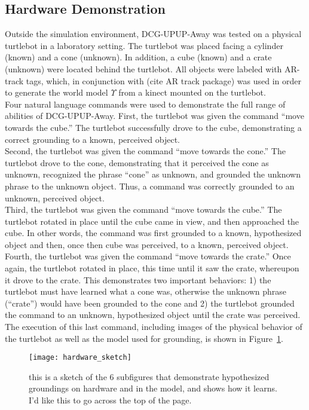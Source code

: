 \subsection{Hardware Demonstration}
Outside the simulation environment, DCG-UPUP-Away was tested on a physical turtlebot in a laboratory setting.
The turtlebot was placed facing a cylinder (known) and a cone (unknown).
In addition, a cube (known) and a crate (unknown) were located behind the turtlebot.
All objects were labeled with AR-track tags, which, in conjunction with (cite AR track package) was used in order to generate the world model $\Upsilon$ from a kinect mounted on the turtlebot.\\
\indent Four natural language commands were used to demonstrate the full range of abilities of DCG-UPUP-Away.
First, the turtlebot was given the command ``move towards the cube.''
The turtlebot successfully drove to the cube, demonstrating a correct grounding to a known, perceived object.\\
\indent Second, the turtlebot was given the command ``move towards the cone.''
The turtlebot drove to the cone, demonstrating that it perceived the cone as unknown, recognized the phrase ``cone'' as unknown, and grounded the unknown phrase to the unknown object.
Thus, a command was correctly grounded to an unknown, perceived object.\\
\indent Third, the turtlebot was given the command ``move towards the cube.''
The turtlebot rotated in place until the cube came in view, and then approached the cube.
In other words, the command was first grounded to a known, hypothesized object and then, once then cube was perceived, to a known, perceived object.\\
\indent Fourth, the turtlebot was given the command ``move towards the crate.''
Once again, the turtlebot rotated in place, this time until it saw the crate, whereupon it drove to the crate.
This demonstrates two important behaviors: 1) the turtlebot must have learned what a cone was, otherwise the unknown phrase (``crate'') would have been grounded to the cone and 2) the turtlebot grounded the command to an unknown, hypothesized object until the crate was perceived.
The execution of this last command, including images of the physical behavior of the turtlebot as well as the model used for grounding, is shown in Figure~\ref{fig:hardware_demo}.

\begin{figure}[ht]
\centering
\texttt{[image: hardware\_sketch]}
\caption{this is a sketch of the 6 subfigures that demonstrate hypothesized groundings on hardware and in the model, and shows how it learns. I'd like this to go across the top of the page.}
\label{fig:hardware_demo}
\end{figure}

